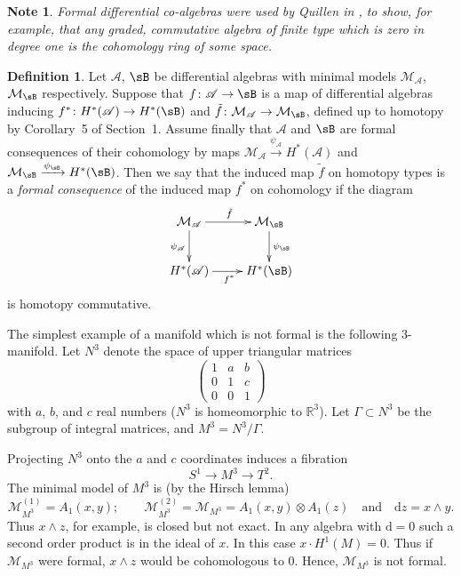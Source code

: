 \documentclass[11pt]{amsart}
\theoremstyle{plain}
\newtheorem{note}[theorem]{Note}
\theoremstyle{definition}
\newtheorem{definition}[theorem]{Definition}
\newcommand{\sA}{\mathscr{A}}
\newcommand{\cM}{\mathcal{M}}
\newcommand{\dd}{\mathrm{d}}
\newcommand{\RR}{\mathbb{R}}
\begin{document}
\begin{note}
Formal differential co-algebras were used by Quillen in \cite{Q}, to show, for example, that any graded, commutative algebra of finite type which is zero in degree one is the cohomology ring of some space.
\end{note}

\begin{definition}
Let $\sA$, $\sB$ be differential algebras with minimal models $\cM_{\sA}$, $\cM_{\sB}$ respectively. Suppose that $f \colon \sA \to \sB$ is a map of differential algebras inducing $f^{*} \colon H^{*}(\sA) \to H^{*}(\sB)$ and $\tilde{f} \colon \cM_{\sA} \to \cM_{\sB}$, defined up to homotopy by Corollary~5 of Section~1. Assume finally that $\sA$ and $\sB$ are formal consequences of their cohomology by maps $\cM_{\sA} \xrightarrow{\psi_{\sA}} H^{*}(\sA)$ and $\cM_{\sB} \xrightarrow{\psi_{\sB}} H^{*}(\sB)$. Then we say that the induced map $\tilde{f}$ on homotopy types is a \emph{formal consequence} of the induced map $f^{*}$ on cohomology if the diagram
\[
\xymatrix{
\cM_{\sA} \ar[r]^{\tilde{f}} \ar[d]_{\psi_{\sA}} & \cM_{\sB} \ar[d]^{\psi_{\sB}} \\
H^{*}(\sA) \ar[r]_{f^{*}} & H^{*}(\sB)
}
\]
is homotopy commutative.
\end{definition}

The simplest example of a manifold which is not formal is the following $3$-manifold. Let $N^{3}$ denote the space of upper triangular matrices
\[
\begin{pmatrix}
1 & a & b \\
0 & 1 & c \\
0 & 0 & 1
\end{pmatrix}
\]
with $a$, $b$, and $c$ real numbers ($N^{3}$ is homeomorphic to $\RR^{3}$). Let $\Gamma \subset N^{3}$ be the subgroup of integral matrices, and $M^{3} = N^{3}/\Gamma$.

Projecting $N^{3}$ onto the $a$ and $c$ coordinates induces a fibration
\[
S^{1} \longrightarrow M^{3} \longrightarrow T^{2}.
\]
The minimal model of $M^{3}$ is (by the Hirsch lemma)
\[
\cM_{M^{3}}^{(1)} = A_{1}(x,y); \qquad \cM_{M^{3}}^{(2)} = \cM_{M^{3}} = A_{1}(x,y) \otimes A_{1}(z) \quad \text{and} \quad \dd z = x \wedge y.
\]
Thus $x \wedge z$, for example, is closed but not exact. In any algebra with $\dd = 0$ such a second order product is in the ideal of $x$. In this case $x \cdot H^{1}(M) = 0$. Thus if $\cM_{M^{3}}$ were formal, $x \wedge z$ would be cohomologous to $0$. Hence, $\cM_{M^{3}}$ is not formal.
\end{document}

